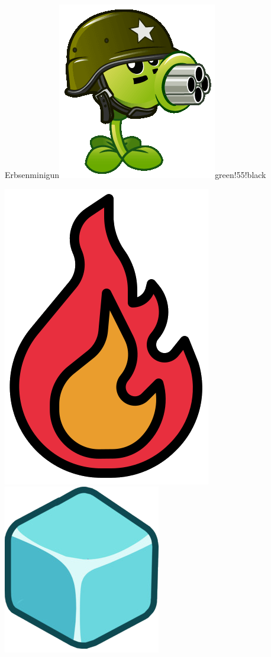 \documentclass[11pt, a5paper]{article}
\def\now{\hspace{0.2cm}}
\begin{document}
\begin{mybox}{Erbsenminigun}{\includegraphics[scale=0.1]{minigun}}{green!55!black}
\begin{minipage}[t]{\textwidth}
			\now\includegraphics[scale=0.075]{firef} 
			\now\includegraphics[scale=0.3]{icei} 
		\end{minipage}
	\end{mybox}
	
\end{document}
